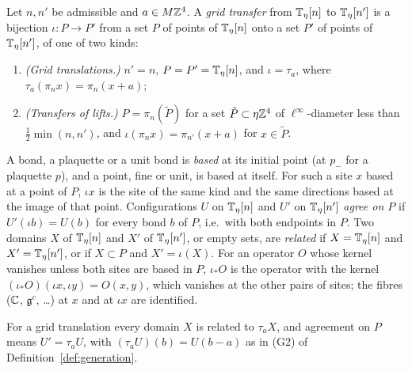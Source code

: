 \begin{definition}\label{def:grid-transfer}
Let $n,n'$ be admissible and $a\in M\mathbb Z^4$. A \emph{grid transfer} from $\mathbb T_\eta[n]$ to $\mathbb T_\eta[n']$ is a bijection $\iota:P\to P'$ from a set $P$ of points of $\mathbb T_\eta[n]$ onto a set $P'$ of points of $\mathbb T_\eta[n']$, of one of two kinds:
\begin{enumerate}[label=(\roman*)]
\item \emph{(Grid translations.)} $n'=n$, $P=P'=\mathbb T_\eta[n]$, and $\iota=\tau_a$, where $\tau_a(\pi_nx)=\pi_n(x+a)$;
\item \emph{(Transfers of lifts.)} $P=\pi_n(\tilde P)$ for a set $\tilde P\subset\eta\mathbb Z^4$ of $\ell^\infty$-diameter less than $\frac12\min(n,n')$, and $\iota(\pi_nx)=\pi_{n'}(x+a)$ for $x\in\tilde P$.
\end{enumerate}
A bond, a plaquette or a unit bond is \emph{based} at its initial point (at $p_-$ for a plaquette $p$), and a point, fine or unit, is based at itself. For such a site $x$ based at a point of $P$, $\iota x$ is the site of the same kind and the same directions based at the image of that point. Configurations $U$ on $\mathbb T_\eta[n]$ and $U'$ on $\mathbb T_\eta[n']$ \emph{agree on $P$} if $U'(\iota b)=U(b)$ for every bond $b$ of $P$, i.e.\ with both endpoints in $P$. Two domains $X$ of $\mathbb T_\eta[n]$ and $X'$ of $\mathbb T_\eta[n']$, or empty sets, are \emph{related} if $X=\mathbb T_\eta[n]$ and $X'=\mathbb T_\eta[n']$, or if $X\subset P$ and $X'=\iota(X)$. For an operator $O$ whose kernel vanishes unless both sites are based in $P$, $\iota_*O$ is the operator with the kernel $(\iota_*O)(\iota x,\iota y)=O(x,y)$, which vanishes at the other pairs of sites; the fibres ($\mathbb C$, $\mathfrak g^c$, \dots) at $x$ and at $\iota x$ are identified.
\end{definition}

For a grid translation every domain $X$ is related to $\tau_aX$, and agreement on $P$ means $U'=\tau_aU$, with $(\tau_aU)(b)=U(b-a)$ as in (G2) of Definition~\ref{def:generation}.

